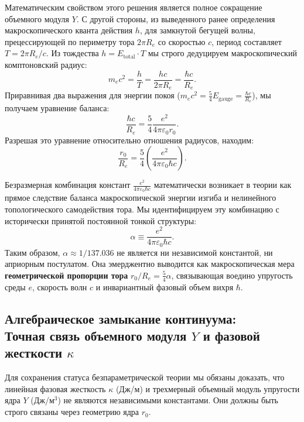 \documentclass[11pt,a4paper]{article}
\begin{document}
	Математическим свойством этого решения является полное сокращение объемного модуля $Y$. 
	С другой стороны, из выведенного ранее определения макроскопического кванта действия $h$, для замкнутой бегущей волны, прецессирующей по периметру тора $2\pi R_e$ со скоростью $c$, период составляет $T = 2\pi R_e/c$. Из тождества $h = E_{\text{total}} \cdot T$ мы строго дедуцируем макроскопический комптоновский радиус:
	\begin{equation}
		m_e c^2 = \frac{h}{T} = \frac{h c}{2\pi R_e} = \frac{\hbar c}{R_e}.
	\end{equation}
	Приравнивая два выражения для энергии покоя ($m_e c^2 = \frac{5}{4} E_{\text{gauge}} = \frac{\hbar c}{R_e}$), мы получаем уравнение баланса:
	\begin{equation}
		\frac{\hbar c}{R_e} = \frac{5}{4} \frac{e^2}{4\pi\varepsilon_0 r_0}.
	\end{equation}
	Разрешая это уравнение относительно отношения радиусов, находим:
	\begin{equation}
		\frac{r_0}{R_e} = \frac{5}{4} \left( \frac{e^2}{4\pi\varepsilon_0 \hbar c} \right).
		\label{alpha_derivation}
	\end{equation}
	
	Безразмерная комбинация констант $\frac{e^2}{4\pi\varepsilon_0 \hbar c}$ математически возникает в теории как прямое следствие баланса макроскопической энергии изгиба и нелинейного топологического самодействия тора. 
	Мы идентифицируем эту комбинацию с исторически принятой постоянной тонкой структуры:
	\begin{equation}
		\alpha \equiv \frac{e^2}{4\pi\varepsilon_0 \hbar c}.
	\end{equation}
	Таким образом, $\alpha \approx 1/137.036$ не является ни независимой константой, ни априорным постулатом. Она эмерджентно выводится как макроскопическая мера \textbf{геометрической пропорции тора} $r_0/R_e = \frac{5}{4}\alpha$, связывающая воедино упругость среды $e$, скорость волн $c$ и инвариантный фазовый объем вихря $\hbar$.
	
\subsection{Алгебраическое замыкание континуума:\\ Точная связь объемного модуля $Y$ и фазовой жесткости $\kappa$}
Для сохранения статуса безпараметрической теории мы обязаны доказать, что линейная фазовая жесткость $\kappa$ (Дж/м) и трехмерный объемный модуль упругости  ядра $Y$ (Дж/м$^3$) не являются независимыми константами. Они должны быть строго связаны через геометрию ядра $r_0$.
\end{document}
